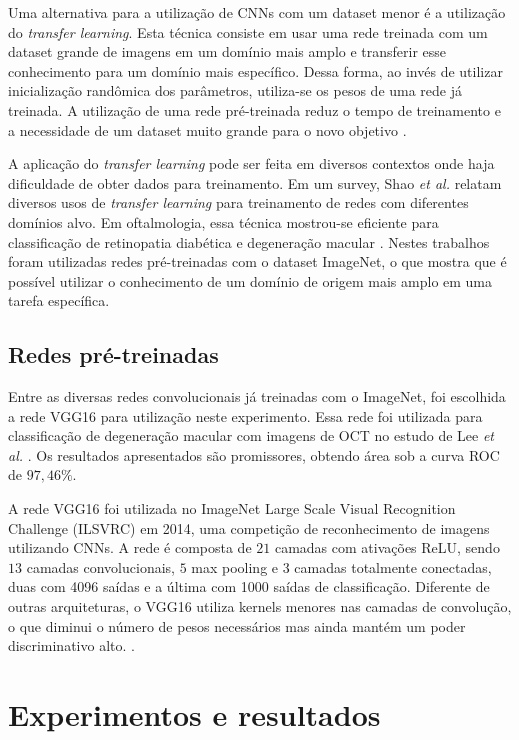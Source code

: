 \documentclass[conference]{IEEEtran}
\begin{document}
  Uma alternativa para a utilização de CNNs com um dataset menor é a utilização do \textit{transfer learning}. Esta técnica consiste em usar uma rede treinada com um dataset grande de imagens em um domínio mais amplo e transferir esse conhecimento para um domínio mais específico. Dessa forma, ao invés de utilizar inicialização randômica dos parâmetros, utiliza-se os pesos de uma rede já treinada. A utilização de uma rede pré-treinada reduz o tempo de treinamento e a necessidade de um dataset muito grande para o novo objetivo \cite{tan2018}.

  A aplicação do \textit{transfer learning} pode ser feita em diversos contextos onde haja dificuldade de obter dados para treinamento. Em um survey, Shao \textit{et al.} \cite{shao2015} relatam diversos usos de \textit{transfer learning} para treinamento de redes com diferentes domínios alvo. Em oftalmologia, essa técnica mostrou-se eficiente para classificação de retinopatia diabética \cite{li2017} e degeneração macular \cite{lee2017}. Nestes trabalhos foram utilizadas redes pré-treinadas com o dataset ImageNet, o que mostra que é possível utilizar o conhecimento de um domínio de origem mais amplo em uma tarefa específica. 

  \subsection{Redes pré-treinadas}


  Entre as diversas redes convolucionais já treinadas com o ImageNet, foi escolhida a rede VGG16 para utilização neste experimento. Essa rede foi utilizada para classificação de degeneração macular com imagens de OCT no estudo de Lee \textit{et al.} \cite{lee2017}. Os resultados apresentados são promissores, obtendo área sob a curva ROC de $97,46\%$.

  A rede VGG16 foi utilizada no ImageNet Large Scale Visual Recognition Challenge (ILSVRC) em 2014, uma competição de reconhecimento de imagens utilizando CNNs. A rede é composta de $21$ camadas com ativações ReLU, sendo $13$ camadas convolucionais, $5$ max pooling e $3$ camadas totalmente conectadas, duas com 4096 saídas e a última com 1000 saídas de classificação. Diferente de outras arquiteturas, o VGG16 utiliza kernels menores nas camadas de convolução, o que diminui o número de pesos necessários mas ainda mantém um poder discriminativo alto. \cite{simonyan2014}.

\section{Experimentos e resultados}
\end{document}
